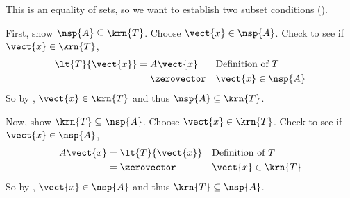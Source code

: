 This is an equality of sets, so we want to establish two subset conditions ().\par
%
First, show $\nsp{A}\subseteq\krn{T}$.  Choose $\vect{x}\in\nsp{A}$.  Check to see if $\vect{x}\in\krn{T}$,
%
\begin{align*}
\lt{T}{\vect{x}}
&=A\vect{x}&&\text{Definition of $T$}\\
&=\zerovector&&\text{$\vect{x}\in\nsp{A}$}
\end{align*}
%
So by , $\vect{x}\in\krn{T}$ and thus $\nsp{A}\subseteq\krn{T}$.\par
%
Now, show $\krn{T}\subseteq\nsp{A}$.  Choose $\vect{x}\in\krn{T}$.  Check to see if $\vect{x}\in\nsp{A}$,
%
\begin{align*}
A\vect{x}
&=\lt{T}{\vect{x}}&&\text{Definition of $T$}\\
&=\zerovector&&\text{$\vect{x}\in\krn{T}$}
\end{align*}
%
So by , $\vect{x}\in\nsp{A}$ and thus $\krn{T}\subseteq\nsp{A}$.\par
